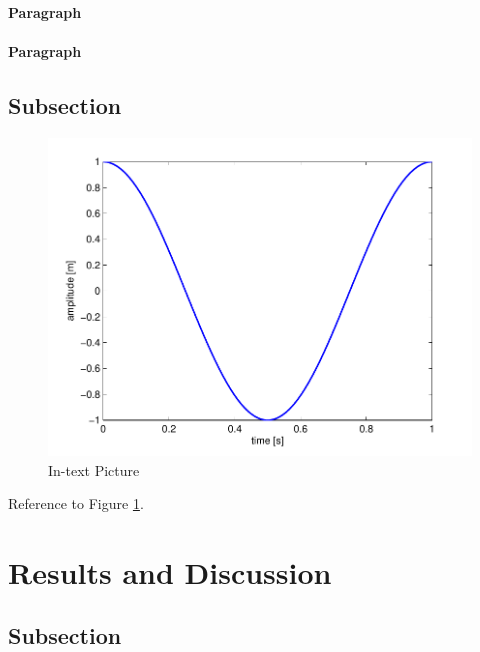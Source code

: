 \documentclass[fleqn,10pt]{wlpeerj}
\begin{document}
\lipsum[6] %

\paragraph{Paragraph} \lipsum[7] %
\paragraph{Paragraph} \lipsum[8] %

\subsection*{Subsection}

\lipsum[9] %

\begin{figure}[ht]\centering
\includegraphics[width=\linewidth]{results}
\caption{In-text Picture}
\label{fig:results}
\end{figure}

Reference to Figure \ref{fig:results}.

\section*{Results and Discussion}

\lipsum[10] %

\subsection*{Subsection}
\end{document}
